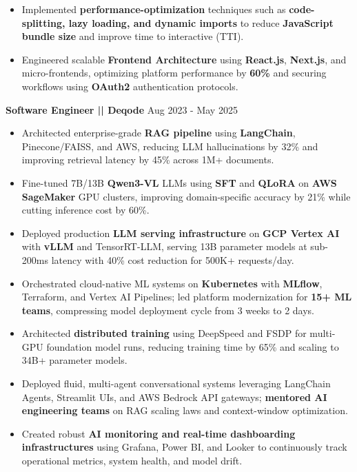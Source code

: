 \documentclass[a4paper]{article}
\begin{document}
\begin{itemize}
\item {Implemented \textbf{performance-optimization} techniques such as \textbf{code-splitting, lazy loading, and dynamic imports} to reduce \textbf{JavaScript bundle size} and improve time to interactive (TTI).}
\item {Engineered scalable \textbf{Frontend Architecture} using \textbf{React.js}, \textbf{Next.js}, and micro-frontends, optimizing platform performance by \textbf{60\%} and securing workflows using \textbf{OAuth2} authentication protocols.}
\end{itemize}




\vspace{5pt}
\textbf{Software Engineer || Deqode}
\hfill Aug 2023 - May 2025
\begin{itemize}
\vspace{2pt}
\item {Architected enterprise-grade \textbf{RAG pipeline} using \textbf{LangChain}, Pinecone/FAISS, and AWS, reducing LLM hallucinations by 32\% and improving retrieval latency by 45\% across 1M+ documents.}
\item {Fine-tuned 7B/13B \textbf{Qwen3-VL} LLMs using \textbf{SFT} and \textbf{QLoRA} on \textbf{AWS SageMaker} GPU clusters, improving domain-specific accuracy by 21\% while cutting inference cost by 60\%.}
\item {Deployed production \textbf{LLM serving infrastructure} on \textbf{GCP Vertex AI} with \textbf{vLLM} and TensorRT-LLM, serving 13B parameter models at sub-200ms latency with 40\% cost reduction for 500K+ requests/day.}
\item {Orchestrated cloud-native ML systems on \textbf{Kubernetes} with \textbf{MLflow}, Terraform, and Vertex AI Pipelines; led platform modernization for \textbf{15+ ML teams}, compressing model deployment cycle from 3 weeks to 2 days.}
\item {Architected \textbf{distributed training} using DeepSpeed and FSDP for multi-GPU foundation model runs, reducing training time by 65\% and scaling to 34B+ parameter models.}
\item {Deployed fluid, multi-agent conversational systems leveraging LangChain Agents, Streamlit UIs, and AWS Bedrock API gateways; \textbf{mentored AI engineering teams} on RAG scaling laws and context-window optimization.}
\item {Created robust \textbf{AI monitoring and real-time dashboarding infrastructures} using Grafana, Power BI, and Looker to continuously track operational metrics, system health, and model drift.}

\end{itemize}
\end{document}
